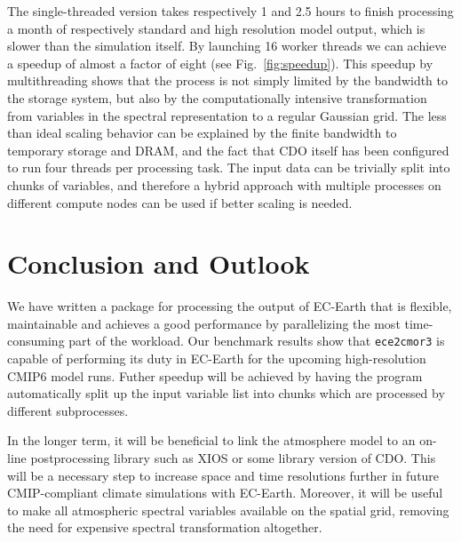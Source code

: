 \documentclass[procedia]{easychair}
\begin{document}
The single-threaded version takes respectively 1 and 2.5 hours to finish 
processing a month of respectively standard and high resolution model output, 
which is slower than the simulation itself. By launching 16 worker threads 
we can achieve a speedup of almost a factor of eight (see 
Fig.~\ref{fig:speedup}). This speedup by multithreading shows that the process 
is not simply limited by the bandwidth to the storage system, but also by the 
computationally intensive transformation from variables in the spectral 
representation to a regular Gaussian grid. The less than ideal scaling 
behavior can be explained by the finite bandwidth to temporary storage and 
DRAM, and the fact that CDO itself has been configured to run four threads per 
processing task. The input data can be trivially split into chunks of 
variables, and therefore a hybrid approach with multiple processes on different 
compute nodes can be used if better scaling is needed.


\section{Conclusion and Outlook}

We have written a package for processing the output of EC-Earth that is 
flexible, maintainable and achieves a good performance by parallelizing the 
most time-consuming part of the workload. Our benchmark results show that 
\texttt{ece2cmor3} is capable of performing its duty in EC-Earth for the 
upcoming high-resolution CMIP6 model runs. Futher speedup will be achieved by 
having the program automatically split up the input variable list into chunks 
which are processed by different subprocesses.

In the longer term, it will be beneficial to link the atmosphere model to an 
on-line postprocessing library such as XIOS or some library version of CDO. 
This will be a necessary step to increase space and time resolutions further in 
future CMIP-compliant climate simulations with EC-Earth. Moreover, it will be 
useful to make all atmospheric spectral variables available on the spatial 
grid, removing the need for expensive spectral transformation altogether.


%
\label{sect:bib}

%
%
%


\end{document}
